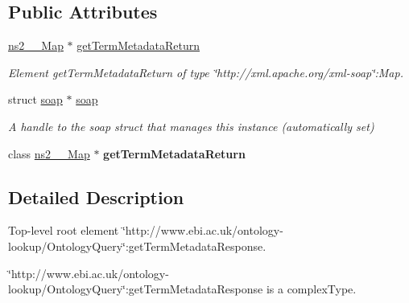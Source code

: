 \subsection*{Public Attributes}
\begin{DoxyCompactItemize}
\item 
\hyperlink{classns2____Map}{ns2\_\-\_\-Map} $\ast$ \hyperlink{class__ns1____getTermMetadataResponse_a3d673b73f83838e01b2fd182b60f4df2}{getTermMetadataReturn}
\begin{DoxyCompactList}\small\item\em Element getTermMetadataReturn of type \char`\"{}http://xml.apache.org/xml-\/soap\char`\"{}:Map. \end{DoxyCompactList}\item 
\hypertarget{class__ns1____getTermMetadataResponse_abd04d691dac037cc7aa9b1404b279212}{
struct \hyperlink{class__ns1____getTermMetadataResponse_abd04d691dac037cc7aa9b1404b279212}{soap} $\ast$ \hyperlink{class__ns1____getTermMetadataResponse_abd04d691dac037cc7aa9b1404b279212}{soap}}
\label{class__ns1____getTermMetadataResponse_abd04d691dac037cc7aa9b1404b279212}

\begin{DoxyCompactList}\small\item\em A handle to the soap struct that manages this instance (automatically set) \end{DoxyCompactList}\item 
\hypertarget{class__ns1____getTermMetadataResponse_af5c6b1fd32e8193030b3c01f94b539e7}{
class \hyperlink{classns2____Map}{ns2\_\-\_\-Map} $\ast$ {\bfseries getTermMetadataReturn}}
\label{class__ns1____getTermMetadataResponse_af5c6b1fd32e8193030b3c01f94b539e7}

\end{DoxyCompactItemize}


\subsection{Detailed Description}
Top-\/level root element \char`\"{}http://www.ebi.ac.uk/ontology-\/lookup/OntologyQuery\char`\"{}:getTermMetadataResponse. 

\char`\"{}http://www.ebi.ac.uk/ontology-\/lookup/OntologyQuery\char`\"{}:getTermMetadataResponse is a complexType. 

